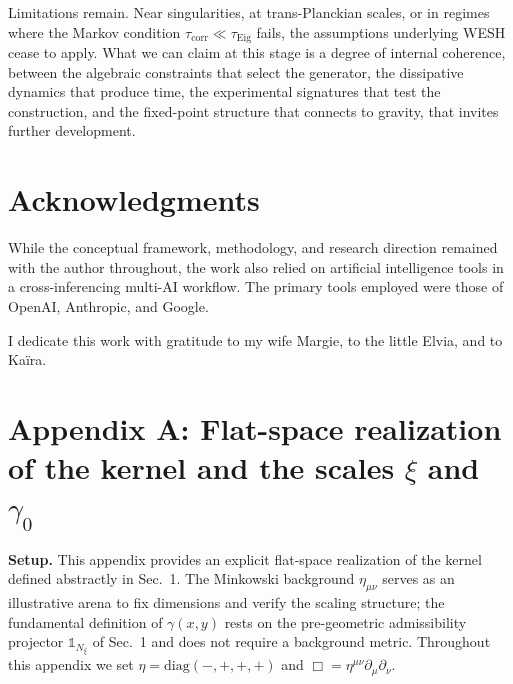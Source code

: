 \documentclass[12pt,a4paper]{article}
\numberwithin{equation}{section}
\begin{document}
\vspace{0.3cm}
\noindent Limitations remain. Near singularities, at trans-Planckian scales, or in regimes where the Markov condition $\tau_{\mathrm{corr}} \ll \tau_{\mathrm{Eig}}$ fails, the assumptions underlying WESH cease to apply. What we can claim at this stage is a degree of internal coherence, between the algebraic constraints that select the generator, the dissipative dynamics that produce time, the experimental signatures that test the construction, and the fixed-point structure that connects to gravity, that invites further development.
\vspace{1cm}

\section*{Acknowledgments}

\vspace{0.3cm}
\noindent While the conceptual framework, methodology, and research direction remained with the author throughout, the work also relied on artificial intelligence tools in a cross-inferencing multi-AI workflow. The primary tools employed were those of OpenAI, Anthropic, and Google. 

\vspace{0.3cm}
\noindent I dedicate this work with gratitude to my wife Margie, to the little Elvia, and to Ka\"ira.

\vspace{0.8cm}

\section*{Appendix A: Flat-space realization of the kernel and the scales \texorpdfstring{$\xi$}{ξ} and \texorpdfstring{$\gamma_0$}{γ0}}
\vspace{0.6cm}

\begingroup
\setcounter{equation}{0}
\renewcommand{\theequation}{A.\arabic{equation}}
\renewcommand{\theHequation}{A.\arabic{equation}}

\noindent\textbf{Setup.}
This appendix provides an explicit flat-space realization of the kernel defined abstractly in Sec.~1. The Minkowski background $\eta_{\mu\nu}$ serves as an illustrative arena to fix dimensions and verify the scaling structure; the fundamental definition of $\gamma(x,y)$ rests on the pre-geometric admissibility projector $\mathbb{1}_{N_\xi}$ of Sec.~1 and does not require a background metric. Throughout this appendix we set \(\eta=\mathrm{diag}(-,+,+,+)\) and \(\Box=\eta^{\mu\nu}\partial_\mu\partial_\nu\).
\end{document}
